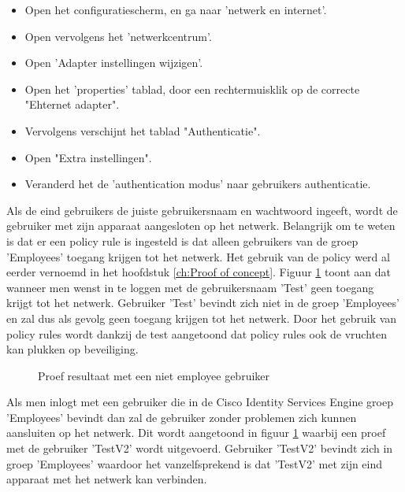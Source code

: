 \begin{itemize}
	\item Open het configuratiescherm, en ga naar 'netwerk en internet'.
	\item Open vervolgens het 'netwerkcentrum'.
	\item Open 'Adapter instellingen wijzigen'.
	\item Open het 'properties' tablad, door een rechtermuisklik op de correcte "Ehternet adapter".
	\item Vervolgens verschijnt het tablad "Authenticatie".
	\item Open "Extra instellingen".
	\item Veranderd het de 'authentication modus' naar gebruikers authenticatie.
\end{itemize}
Als de eind gebruikers de juiste gebruikersnaam en wachtwoord ingeeft, wordt de gebruiker met zijn apparaat aangesloten op het netwerk. Belangrijk om te weten is dat er een policy rule is ingesteld is dat alleen gebruikers van de groep 'Employees' toegang krijgen tot het netwerk. Het gebruik van de policy werd al eerder vernoemd in het hoofdstuk \ref{ch:Proof of concept}.
\newline
\newline
Figuur \ref{fig:Test_gebruiker} toont aan dat wanneer men wenst in te loggen met de gebruikersnaam 'Test' geen toegang krijgt tot het netwerk. Gebruiker 'Test' bevindt zich niet in de groep 'Employees' en zal dus als gevolg geen toegang krijgen tot het netwerk. Door het gebruik van policy rules wordt dankzij de test aangetoond dat policy rules ook de vruchten kan plukken op beveiliging.

\begin{figure}[H]
	\centering
	\qquad
	\newline
	\qquad
	\caption{Proef resultaat met een niet employee gebruiker}%
	\label{fig:Test_gebruiker}%
\end{figure}
	
Als men inlogt met een gebruiker die in de Cisco Identity Services Engine groep 'Employees' bevindt dan zal de gebruiker zonder problemen zich kunnen aansluiten op het netwerk. Dit wordt aangetoond in figuur \ref{fig:Test_gebruiker} waarbij een proef met de gebruiker 'TestV2' wordt uitgevoerd. Gebruiker 'TestV2' bevindt zich in groep 'Employees' waardoor het vanzelfsprekend is dat 'TestV2' met zijn eind apparaat met het netwerk kan verbinden. 

